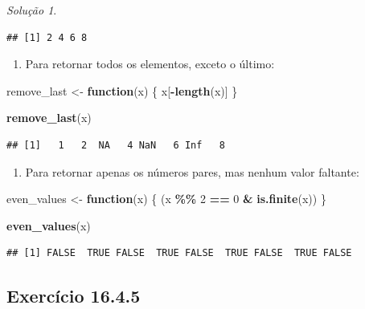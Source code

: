 \documentclass[
]{latex/krantz}
\newenvironment{Shaded}{\begin{snugshade}}{\end{snugshade}}
\newcommand{\ControlFlowTok}[1]{\textcolor[rgb]{0.13,0.29,0.53}{\textbf{#1}}}
\newcommand{\DecValTok}[1]{\textcolor[rgb]{0.00,0.00,0.81}{#1}}
\newcommand{\FunctionTok}[1]{\textcolor[rgb]{0.13,0.29,0.53}{\textbf{#1}}}
\newcommand{\NormalTok}[1]{#1}
\newcommand{\OtherTok}[1]{\textcolor[rgb]{0.56,0.35,0.01}{#1}}
\newcommand{\SpecialCharTok}[1]{\textcolor[rgb]{0.81,0.36,0.00}{\textbf{#1}}}
\providecommand{\tightlist}{%
  \setlength{\itemsep}{0pt}\setlength{\parskip}{0pt}}
\theoremstyle{definition}
\theoremstyle{definition}
\theoremstyle{definition}
\theoremstyle{definition}
\theoremstyle{remark}
\newtheorem*{solution}{Solução}
\begin{document}
\begin{solution}
\begin{verbatim}
## [1] 2 4 6 8
\end{verbatim}

\begin{enumerate}
\def\labelenumi{\alph{enumi}.}
\setcounter{enumi}{2}
\tightlist
\item
  Para retornar todos os elementos, exceto o último:
\end{enumerate}

\begin{Shaded}
\begin{Highlighting}[]
\NormalTok{remove\_last }\OtherTok{\textless{}{-}} \ControlFlowTok{function}\NormalTok{(x) \{}
\NormalTok{  x[}\SpecialCharTok{{-}}\FunctionTok{length}\NormalTok{(x)]}
\NormalTok{\}}

\FunctionTok{remove\_last}\NormalTok{(x)}
\end{Highlighting}
\end{Shaded}

\begin{verbatim}
## [1]   1   2  NA   4 NaN   6 Inf   8
\end{verbatim}

\begin{enumerate}
\def\labelenumi{\alph{enumi}.}
\setcounter{enumi}{3}
\tightlist
\item
  Para retornar apenas os números pares, mas nenhum valor faltante:
\end{enumerate}

\begin{Shaded}
\begin{Highlighting}[]
\NormalTok{even\_values }\OtherTok{\textless{}{-}} \ControlFlowTok{function}\NormalTok{(x) \{}
\NormalTok{  (x }\SpecialCharTok{\%\%} \DecValTok{2} \SpecialCharTok{==} \DecValTok{0} \SpecialCharTok{\&} \FunctionTok{is.finite}\NormalTok{(x))}
\NormalTok{\}}

\FunctionTok{even\_values}\NormalTok{(x)}
\end{Highlighting}
\end{Shaded}

\begin{verbatim}
## [1] FALSE  TRUE FALSE  TRUE FALSE  TRUE FALSE  TRUE FALSE
\end{verbatim}

\end{solution}

\hypertarget{exr16-4-5}{%
\subsection*{Exercício 16.4.5}\label{exr16-4-5}}
\end{document}
